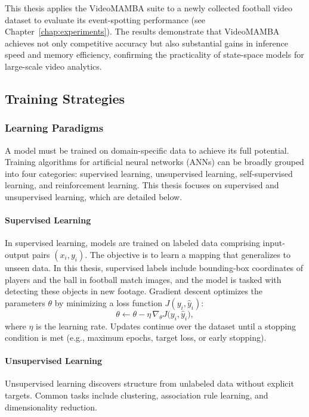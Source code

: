 This thesis applies the VideoMAMBA suite to a newly collected football video dataset to evaluate its event-spotting performance (see Chapter~\ref{chap:experiments}). The results demonstrate that VideoMAMBA achieves not only competitive accuracy but also substantial gains in inference speed and memory efficiency, confirming the practicality of state-space models for large-scale video analytics. 


\subsection{Training Strategies}
\label{ssec:training_stratergies}
\subsubsection{Learning Paradigms}
A model must be trained on domain-specific data to achieve its full potential. Training algorithms for artificial neural networks (ANNs) can be broadly grouped into four categories: supervised learning, unsupervised learning, self-supervised learning, and reinforcement learning. This thesis  focuses on supervised and unsupervised learning, which are detailed below.

\paragraph{Supervised Learning}
In supervised learning, models are trained on labeled data comprising input-output pairs \((x_i, y_i)\). The objective is to learn a mapping that generalizes to unseen data. In this thesis, supervised labels include bounding-box coordinates of players and the ball in football match images, and the model is tasked with detecting these objects in new footage. Gradient descent optimizes the parameters \(\theta\) by minimizing a loss function \(J(y_i, \hat y_i)\):  
\[
\theta \leftarrow \theta - \eta \,\nabla_{\theta}J\bigl(y_i,\hat y_i\bigr),
\]
where \(\eta\) is the learning rate. Updates continue over the dataset until a stopping condition is met (e.g., maximum epochs, target loss, or early stopping).

\paragraph{Unsupervised Learning}
Unsupervised learning discovers structure from unlabeled data without explicit targets. Common tasks include clustering, association rule learning, and dimensionality reduction. 


